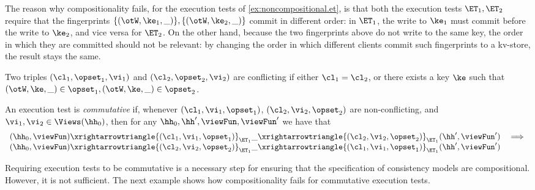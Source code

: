 The reason why compositionality fails, for the execution tests of \cref{ex:noncompositional.et}, 
is that both the execution tests $\ET_1, \ET_2$ require that the fingerprints 
$\{(\otW, \ke_1, \_)\}, \{(\otW, \ke_2, \_)\}$ commit in different order: in $\ET_1$, the write to $\ke_1$ must commit 
before the write to $\ke_2$, and vice versa for $\ET_2$. On the other hand, 
because the two fingerprints above do not write to the same key, 
the order in which they are committed should not be relevant: by changing the order 
in which different clients commit such fingerprints to a kv-store, the result stays the same. 
\begin{definition}
Two triples $(\cl_1, \opset_1, \vi_1)$ and $(\cl_2, \opset_2, \vi_2)$ are 
conflicting if either $\cl_1 = \cl_2$, or there exists a key $\ke$ such that 
$(\otW, \ke, \_) \in \opset_1, (\otW, \ke, \_) \in \opset_2$. 

An execution test is \emph{commutative} if, whenever $(\cl_1, \vi_1, \opset_1)$, 
$(\cl_2, \vi_2, \opset_2)$ are non-conflicting, and $\vi_1, \vi_2 \in \Views(\hh_0)$,  
then for any $\hh_0, \hh', \viewFun, \viewFun'$ we have that 
\[
\begin{array}{lr}
(\hh_0, \viewFun) \xrightarrowtriangle{(\cl_1, \vi_1, \opset_1)}_{\ET_1} 
\_ \xrightarrowtriangle{(\cl_2, \vi_2, \opset_2)}_{\ET_1} (\hh', \viewFun') &\implies \\
(\hh_0, \viewFun) \xrightarrowtriangle{(\cl_2, \vi_2, \opset_2)}_{\ET_1} 
\_ \xrightarrowtriangle{(\cl_1, \vi_1, \opset_1)}_{\ET_1} (\hh', \viewFun')
\end{array}
\]
\end{definition}

Requiring execution tests to be commutative is a necessary step for ensuring 
that the specification of consistency models are compositional. However, it 
is not sufficient. The next example shows how compositionality fails 
for commutative execution tests. 

